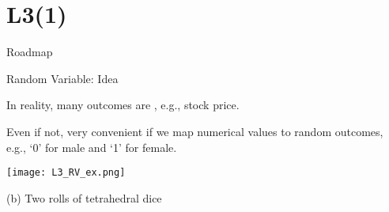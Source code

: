 \section{L3(1)}
\begin{frame}{Roadmap}

\plitemsep 0.1in

\bce[(1)]

\item {}

\item {}

\ece 

\end{frame}

\begin{frame}{Random Variable: Idea}


{
\plitemsep 0.1in

\bci 
\item In reality, many outcomes are , e.g., stock price.

\item Even if not, very convenient if we map numerical values to random outcomes, e.g., `0' for male and `1' for female.

\eci 
}
{
\centering
\texttt{[image: L3\_RV\_ex.png]}

{\scriptsize (b) Two rolls of tetrahedral dice}
}

\end{frame}

